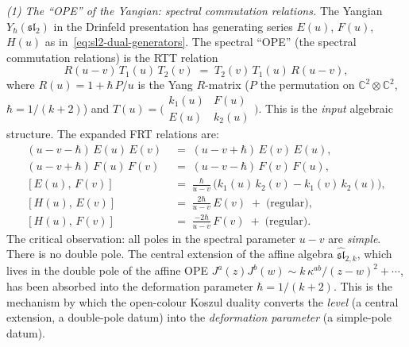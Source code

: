 \begin{computation}
\medskip
\noindent\emph{(1) The ``OPE'' of the Yangian: spectral
commutation relations.}
The Yangian $Y_\hbar(\mathfrak{sl}_2)$ in the Drinfeld
presentation has generating series
$E(u)$, $F(u)$, $H(u)$ as
in~\eqref{eq:sl2-dual-generators}. The spectral
``OPE'' (the spectral commutation relations) is
the RTT relation
\begin{equation}\label{eq:yangian-rtt-input}
R(u{-}v)\,T_1(u)\,T_2(v)
\;=\;
T_2(v)\,T_1(u)\,R(u{-}v),
\end{equation}
where $R(u) = 1 + \hbar\,P/u$ is the Yang $R$-matrix
($P$ the permutation on $\mathbb{C}^2\otimes\mathbb{C}^2$,
$\hbar = 1/(k{+}2)$) and
$T(u) = \bigl(\begin{smallmatrix}
k_1(u) & F(u) \\ E(u) & k_2(u)
\end{smallmatrix}\bigr)$.
This is the \emph{input} algebraic structure. The
expanded FRT relations are:
\begin{align}
(u{-}v{-}\hbar)\,E(u)\,E(v)
&\;=\;
(u{-}v{+}\hbar)\,E(v)\,E(u),
\label{eq:yangian-EE}\\[3pt]
(u{-}v{+}\hbar)\,F(u)\,F(v)
&\;=\;
(u{-}v{-}\hbar)\,F(v)\,F(u),
\label{eq:yangian-FF}\\[3pt]
[E(u),\,F(v)]
&\;=\;
\frac{\hbar}{u{-}v}\,
\bigl(k_1(u)\,k_2(v) - k_1(v)\,k_2(u)\bigr),
\label{eq:yangian-EF}\\[3pt]
[H(u),\,E(v)]
&\;=\;
\frac{2\hbar}{u{-}v}\,E(v)
\;+\;\text{(regular)},
\label{eq:yangian-HE}\\[3pt]
[H(u),\,F(v)]
&\;=\;
\frac{-2\hbar}{u{-}v}\,F(v)
\;+\;\text{(regular)}.
\label{eq:yangian-HF}
\end{align}
The critical observation: all poles in the spectral
parameter $u{-}v$ are \emph{simple}. There is no
double pole. The central extension of the affine algebra
$\widehat{\mathfrak{sl}}_{2,k}$, which lives in the
double pole of the affine OPE
$J^a(z)J^b(w) \sim k\,\kappa^{ab}/(z{-}w)^2 + \cdots$,
has been absorbed into the deformation parameter
$\hbar = 1/(k{+}2)$. This is the mechanism by which
the open-colour Koszul duality converts the
\emph{level} (a central extension, a double-pole datum)
into the \emph{deformation parameter} (a simple-pole
datum).


\end{computation}
